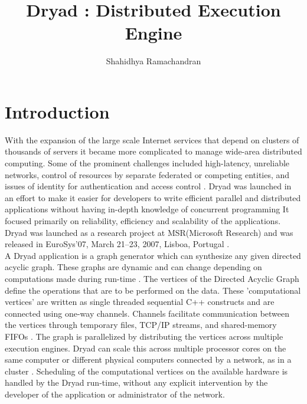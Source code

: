 \documentclass[9pt,twocolumn,twoside]{../../styles/osajnl}
\title{Dryad : Distributed Execution Engine}
\author[1]{Shahidhya Ramachandran}
\affil[1]{School of Informatics and Computing, Bloomington, IN 47408, U.S.A.}
\affil[*]{Corresponding authors: shahrama@iu.edu}
\begin{document}
\maketitle

\section{Introduction}
With the expansion of the large scale Internet services that depend on clusters of thousands of servers it became more complicated to manage wide-area distributed computing. Some of the prominent challenges included high-latency, unreliable networks, control of resources by separate federated or competing entities, and issues of identity for authentication and access control \cite{DryadMSR1}. Dryad was launched in an effort to make it easier for developers to write efficient parallel and distributed applications without having in-depth knowledge of concurrent programming \cite{www-Dryad1} It focused primarily on reliability, efficiency and scalability of the applications.
Dryad was launched as a research project at MSR(Microsoft Research) and was released in EuroSys’07, March 21–23, 2007, Lisboa, Portugal \cite{DryadMSR}.\\
A Dryad application is a graph generator which can synthesize any given directed acyclic graph. These graphs are dynamic and can change depending on computations made during run-time \cite{www-Dryad1}. The vertices of the Directed Acyclic Graph define the operations that are to be performed on the data. These 'computational vertices' are written as single threaded sequential C++ constructs and are connected using one-way channels. Channels facilitate communication between the  vertices through temporary files, TCP/IP streams, and shared-memory FIFOs \cite{DryadMSR1}. The graph is parallelized by distributing the vertices across multiple execution engines. Dryad can scale this across multiple processor cores on the same computer or different physical computers connected by a network, as in a cluster \cite{DryadMSR1}. Scheduling of the computational vertices on the available hardware is handled by the Dryad run-time, without any explicit intervention by the developer of the application or administrator of the network.
\end{document}
